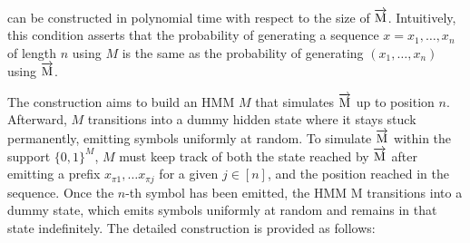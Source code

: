 can be constructed in polynomial time with respect to the size of $\overrightarrow{\text{M}}$. Intuitively, this condition asserts that the probability of generating a sequence $x = x_{1}, \ldots, x_{n}$ of length $n$ using $M$ is the same as the probability of generating $(x_{1}, \ldots, x_{n})$ using $\overrightarrow{\text{M}}$.










The construction aims to build an HMM $M$ that simulates $\overrightarrow{\text{M}}$ up to position $n$. Afterward, $M$ transitions into a dummy hidden state where it stays stuck permanently, emitting symbols uniformly at random. To simulate $\overrightarrow{\text{M}}$ within the support $\{0,1\}^{M}$, $M$ must keep track of both the state reached by $\overrightarrow{\text{M}}$ after emitting a prefix $x_{\pi{1}}, \ldots x_{\pi{j}}$ for a given $j \in [n]$, and the position reached in the sequence. Once the $n$-th symbol has been emitted, the HMM $\text{M}$ transitions into a dummy state, which emits symbols uniformly at random and remains in that state indefinitely. The detailed construction is provided as follows:




